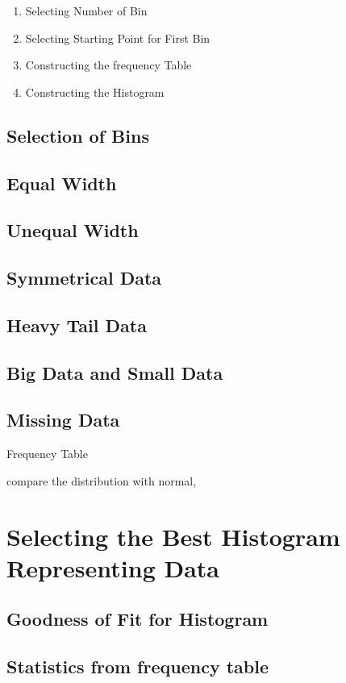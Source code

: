 \begin{enumerate}
	\item Selecting Number of Bin
	\item Selecting Starting Point for First Bin
	\item Constructing the frequency Table
	\item Constructing the Histogram
\end{enumerate}
\subsection{Selection of Bins}

\subsection{Equal Width}

\subsection{Unequal Width}

\subsection{Symmetrical Data}

\subsection{Heavy Tail Data}
 
\subsection{Big Data and Small Data}
\subsection{Missing Data}
 

Frequency Table



compare the distribution with normal,

\section{Selecting the Best Histogram Representing Data}
\subsection{Goodness of Fit for Histogram}
\subsection{Statistics from frequency table}
